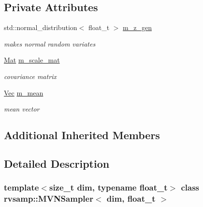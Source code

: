 \subsection*{Private Attributes}
\begin{DoxyCompactItemize}
\item 
\mbox{\label{classrvsamp_1_1MVNSampler_a44d420b751e226b77d8fdfc5c5bef09d}} 
std\+::normal\+\_\+distribution$<$ float\+\_\+t $>$ \hyperlink{classrvsamp_1_1MVNSampler_a44d420b751e226b77d8fdfc5c5bef09d}{m\+\_\+z\+\_\+gen}
\begin{DoxyCompactList}\small\item\em makes normal random variates \end{DoxyCompactList}\item 
\mbox{\label{classrvsamp_1_1MVNSampler_a80319ff672cddccd2dc48a447a7dfac3}} 
\hyperlink{classrvsamp_1_1MVNSampler_ad6891a72b508fd59263c6d62b6bffd14}{Mat} \hyperlink{classrvsamp_1_1MVNSampler_a80319ff672cddccd2dc48a447a7dfac3}{m\+\_\+scale\+\_\+mat}
\begin{DoxyCompactList}\small\item\em covariance matrix \end{DoxyCompactList}\item 
\mbox{\label{classrvsamp_1_1MVNSampler_a0a1de8eea2dfa214c5495ccf226aba9c}} 
\hyperlink{classrvsamp_1_1MVNSampler_a1110bc1695c5c959914602dbaf2f6878}{Vec} \hyperlink{classrvsamp_1_1MVNSampler_a0a1de8eea2dfa214c5495ccf226aba9c}{m\+\_\+mean}
\begin{DoxyCompactList}\small\item\em mean vector \end{DoxyCompactList}\end{DoxyCompactItemize}
\subsection*{Additional Inherited Members}


\subsection{Detailed Description}
\subsubsection*{template$<$size\+\_\+t dim, typename float\+\_\+t$>$\newline
class rvsamp\+::\+M\+V\+N\+Sampler$<$ dim, float\+\_\+t $>$}


